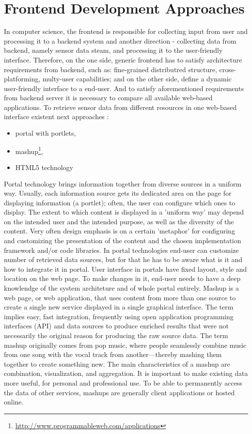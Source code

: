 \section{Frontend Development Approaches}
In computer science, the frontend is responsible for collecting input from user and processing it to a backend system and another direction - collecting data from backend, namely sensor data steam, and processing it to the user-friendly interface. Therefore, on the one side, generic frontend has to satisfy architecture requirements from backend, such as: fine-grained distributred structure, cross-platforming, multy-user capabilities; and on the other side, define a dynamic user-friendly interface to a end-user. And to satisfy aforementioned requirements from backend server it is necessary to compare all available web-based applications.
\newline
To retrieve sensor data from different resources in one web-based interface existent next approaches :
\begin{itemize}
 \item portal with portlets,
 \item mashup\footnote{\url{http://www.programmableweb.com/applications}},
 \item HTML5 technology
\end{itemize}
Portal technology brings information together from diverse sources in a uniform way. Usually, each information source gets its dedicated area on the page for displaying information (a portlet); often, the user can configure which ones to display. The extent to which content is displayed in a 'uniform way' may depend on the intended user and the intended purpose, as well as the diversity of the content. Very often design emphasis is on a certain 'metaphor' for configuring and customizing the presentation of the content and the chosen implementation framework and/or code libraries\cite{pautasso2008restful,seong2006usability}. In portal technologies end-user can customize number of retrieved data sources, but for that he has to be aware what is it and how to integrate it in portal. User interface in portals have fixed layout, style and location on the web page. To make changes in it, end-user needs to have a deep knowlendge of the system architeture and of whole portal entirely.
 \newline
Mashup is a web page, or web application, that uses content from more than one source to create a single new service displayed in a single graphical interface. The term implies easy, fast integration, frequently using open application programming interfaces (API) and data sources to produce enriched results that were not necessarily the original reason for producing the raw source data. The term mashup originally comes from pop music, where people seamlessly combine music from one song with the vocal track from another—thereby mashing them together to create something new. The main characteristics of a mashup are combination, visualization, and aggregation. It is important to make existing data more useful, for personal and professional use. To be able to permanently access the data of other services, mashups are generally client applications or hosted online\cite{mashup}.
